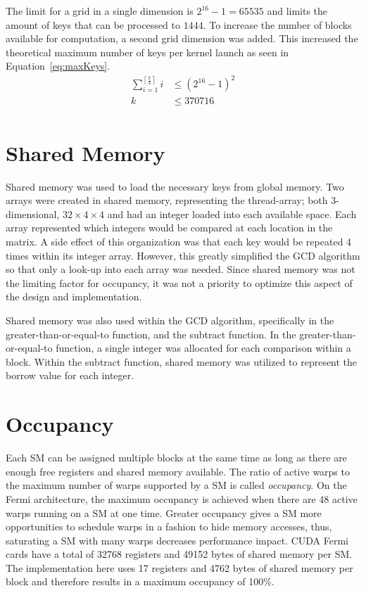 \documentclass[12pt]{ucthesis}
\begin{document}
The limit for a grid in a single dimension is $2^{16} - 1 = 65535$ 
and limits the amount of keys that can be processed to $1444$. To increase 
the number of blocks available for computation, a second grid dimension was 
added. This increased the theoretical maximum number of keys per kernel 
launch as seen in Equation~\ref{eq:maxKeys}.
\begin{equation}
   \begin{split}
   \sum_{i = 1}^{\left\lceil\frac{k}{4}\right\rceil} i & \leq {\left(2^{16} - 
   1\right)}^2\\
   k & \leq 370716\\
   \end{split}
   \label{eq:maxKeys}
\end{equation}

\section{Shared Memory}
\label{subsec:shared}
Shared memory was used to load the necessary keys from global memory. Two 
arrays were created in shared memory, representing the thread-array; both 
3-dimensional, $32\times4\times4$ and had an integer loaded into each 
available space. Each array represented which integers would be compared at 
each location in the matrix. A side effect of this organization was that each key would be 
repeated 4 times within its integer array. However, this greatly simplified 
the GCD algorithm so that only a look-up into each array was needed. Since 
shared memory was not the limiting factor for occupancy, it was not a priority 
to optimize this aspect of the design and implementation. 

Shared memory was also used within the GCD algorithm, specifically in the 
greater-than-or-equal-to function, and the subtract function. In the 
greater-than-or-equal-to function, a single integer was allocated for each 
comparison within a block. Within the subtract function, shared memory was 
utilized to represent the borrow value for each integer. 

\section{Occupancy}
\label{sec:occupancy}
Each SM can be assigned multiple blocks at the same time as long as there are 
enough free registers and shared memory available. The ratio of active warps 
to the maximum number of warps supported by a SM is called \emph{occupancy}. 
On the Fermi architecture, the maximum occupancy is achieved when there are 48 
active warps running on a SM at one time. Greater occupancy gives a SM more
opportunities to schedule warps in a fashion to hide memory accesses, thus,
saturating a SM with many warps decreases performance impact. CUDA Fermi cards
have a total of 32768 registers and 49152 bytes of shared memory per SM. The
implementation here uses 17 registers and 4762 bytes of shared memory per
block and therefore results in a maximum occupancy of 100\%.
\end{document}

